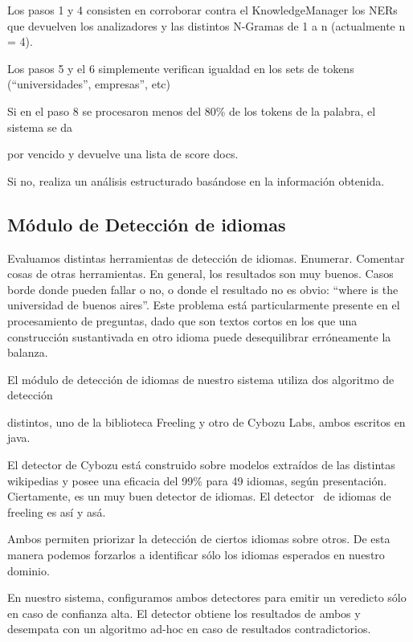 Los pasos 1 y 4 consisten en corroborar contra el KnowledgeManager los
NERs que devuelven los analizadores y las distintos N-Gramas de 1 a n
(actualmente n = 4). 


\bigskip

Los pasos 5 y el 6 simplemente verifican igualdad en los sets de tokens
({\textquotedblleft}universidades{\textquotedblright},
empresas{\textquotedblright}, etc)


\bigskip

Si en el paso 8 se procesaron menos del 80\% de los tokens de la
palabra, el sistema se da 

por vencido y devuelve una lista de score docs.

Si no, realiza un an\'alisis estructurado bas\'andose en la
informaci\'on obtenida.


\bigskip

\subsection{M\'odulo de Detecci\'on de idiomas}

Evaluamos distintas herramientas de detecci\'on de idiomas. Enumerar.
Comentar cosas de otras herramientas. En general, los resultados son
muy buenos. Casos borde donde pueden fallar o no, o donde el resultado
no es obvio: {\textquotedblleft}where is the universidad de buenos
aires{\textquotedblright}. Este problema est\'a particularmente
presente en el procesamiento de preguntas, dado que son textos cortos
en los que una construcci\'on sustantivada en otro idioma puede
desequilibrar err\'oneamente la balanza. 

El m\'odulo de detecci\'on de idiomas de nuestro sistema utiliza dos
algoritmo de detecci\'on 

distintos, uno de la biblioteca Freeling y otro de Cybozu Labs, ambos
escritos en java. 

El detector de Cybozu est\'a construido sobre modelos extra\'idos de las
distintas wikipedias y posee una eficacia del 99\% para 49 idiomas,
seg\'un presentaci\'on. Ciertamente, es un muy buen detector de
idiomas. El detector \ de idiomas de freeling es as\'i y as\'a.

Ambos permiten priorizar la detecci\'on de ciertos idiomas sobre otros.
De esta manera podemos forzarlos a identificar s\'olo los idiomas
esperados en nuestro dominio. 

En nuestro sistema, configuramos ambos detectores para emitir un
veredicto s\'olo en caso de confianza alta. El detector obtiene los
resultados de ambos y desempata con un algoritmo ad-hoc en caso de
resultados contradictorios.


